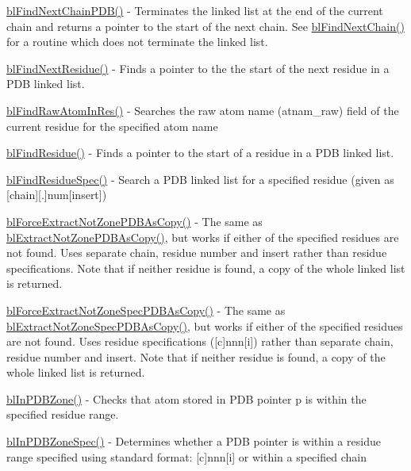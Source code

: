 \begin{DoxyItemize}
\item \hyperlink{_find_next_chain_p_d_b_8c_aee19617cd3ae67b737737a3aaf850484}{bl\-Find\-Next\-Chain\-P\-D\-B()} -\/ Terminates the linked list at the end of the current chain and returns a pointer to the start of the next chain. See \hyperlink{pdb_8h_a5601ab36cb8d8fe8c012821a6e178e02}{bl\-Find\-Next\-Chain()} for a routine which does not terminate the linked list.
\item \hyperlink{_find_next_residue_8c_ae76e39017432838cc6dd70d5ac50f6cf}{bl\-Find\-Next\-Residue()} -\/ Finds a pointer to the the start of the next residue in a P\-D\-B linked list.
\item \hyperlink{_find_raw_atom_in_res_8c_ae0f58a30c8731cbb63b4ba021175c54f}{bl\-Find\-Raw\-Atom\-In\-Res()} -\/ Searches the raw atom name (atnam\-\_\-raw) field of the current residue for the specified atom name
\item \hyperlink{_find_residue_8c_a781ea7a8b1ce623d1f7df8c97a542e38}{bl\-Find\-Residue()} -\/ Finds a pointer to the start of a residue in a P\-D\-B linked list.
\item \hyperlink{_find_residue_spec_8c_a1ce9f52d435f05159b42b5368240f175}{bl\-Find\-Residue\-Spec()} -\/ Search a P\-D\-B linked list for a specified residue (given as \mbox{[}chain\mbox{]}\mbox{[}.\mbox{]}num\mbox{[}insert\mbox{]})
\item \hyperlink{_extract_zone_p_d_b_8c_a38ab1a242a2e2463b3645fe1095ed15a}{bl\-Force\-Extract\-Not\-Zone\-P\-D\-B\-As\-Copy()} -\/ The same as \hyperlink{_extract_zone_p_d_b_8c_a843e1fe5700de558f774a40c25b0fa3d}{bl\-Extract\-Not\-Zone\-P\-D\-B\-As\-Copy()}, but works if either of the specified residues are not found. Uses separate chain, residue number and insert rather than residue specifications. Note that if neither residue is found, a copy of the whole linked list is returned.
\item \hyperlink{_extract_zone_p_d_b_8c_a592e4f0d8fe93d8283d83942f7eda9f2}{bl\-Force\-Extract\-Not\-Zone\-Spec\-P\-D\-B\-As\-Copy()} -\/ The same as \hyperlink{_extract_zone_p_d_b_8c_ac360be7e19a04c45fb1414d4ed5196b3}{bl\-Extract\-Not\-Zone\-Spec\-P\-D\-B\-As\-Copy()}, but works if either of the specified residues are not found. Uses residue specifications (\mbox{[}c\mbox{]}nnn\mbox{[}i\mbox{]}) rather than separate chain, residue number and insert. Note that if neither residue is found, a copy of the whole linked list is returned.
\item \hyperlink{_in_p_d_b_zone_8c_ad1651a4f6bca1953cfe08aa364fe1b1f}{bl\-In\-P\-D\-B\-Zone()} -\/ Checks that atom stored in P\-D\-B pointer p is within the specified residue range.
\item \hyperlink{_in_p_d_b_zone_spec_8c_a090b7822e5901cbf4d30b5acab163d37}{bl\-In\-P\-D\-B\-Zone\-Spec()} -\/ Determines whether a P\-D\-B pointer is within a residue range specified using standard format\-: \mbox{[}c\mbox{]}nnn\mbox{[}i\mbox{]} or within a specified chain
\end{DoxyItemize}

